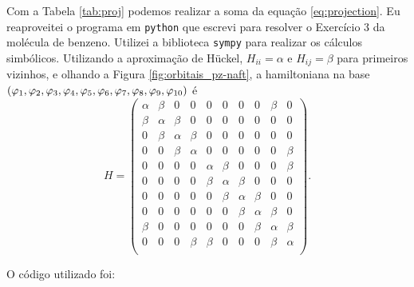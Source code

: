 \documentclass[a4paper,10pt]{article}
\newcommand{\python}[1]{\texttt{#1}}
\begin{document}
Com a Tabela \ref{tab:proj} podemos realizar a soma da equação \ref{eq:projection}. Eu reaproveitei o programa em \python{python} que escrevi para resolver o Exercício 3 da molécula de benzeno. Utilizei a biblioteca \python{sympy} para realizar os cálculos simbólicos. Utilizando a aproximação de Hückel, $H_{ii} = \alpha$ e $H_{ij} = \beta$ para primeiros vizinhos, e olhando a Figura \ref{fig:orbitais_pz-naft}, a hamiltoniana na base $(\varphi_1, \varphi_2, \varphi_3, \varphi_4, \varphi_5, \varphi_6, \varphi_7, \varphi_8, \varphi_9, \varphi_{10})$ é
$$
H=
\begin{pmatrix}
\alpha & \beta & 0 & 0 & 0 & 0 & 0 & 0 & \beta & 0 \\
\beta & \alpha & \beta & 0 & 0 & 0 & 0 & 0 & 0 & 0 \\
0 & \beta & \alpha & \beta & 0 & 0 & 0 & 0 & 0 & 0 \\
0 & 0 & \beta & \alpha & 0 & 0 & 0 & 0 & 0 & \beta \\
0 & 0 & 0 & 0 & \alpha & \beta & 0 & 0 & 0 & \beta \\
0 & 0 & 0 & 0 & \beta & \alpha & \beta & 0 & 0 & 0 \\
0 & 0 & 0 & 0 & 0 & \beta & \alpha & \beta & 0 & 0 \\
0 & 0 & 0 & 0 & 0 & 0 & \beta & \alpha & \beta & 0 \\
\beta & 0 & 0 & 0 & 0 & 0 & 0 & \beta & \alpha & \beta \\
0 & 0 & 0 & \beta & \beta & 0 & 0 & 0 & \beta & \alpha \\
\end{pmatrix}.
$$

O código utilizado foi:
\end{document}
